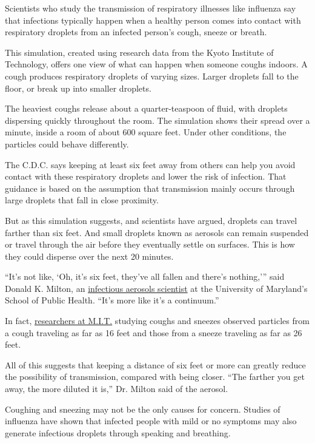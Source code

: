 Scientists who study the transmission of respiratory illnesses like
influenza say that infections typically happen when a healthy person
comes into contact with respiratory droplets from an infected person's
cough, sneeze or breath.

This simulation, created using research data from the Kyoto Institute of
Technology, offers one view of what can happen when someone coughs
indoors. A cough produces respiratory droplets of varying sizes. Larger
droplets fall to the floor, or break up into smaller droplets.

The heaviest coughs release about a quarter-teaspoon of fluid, with
droplets dispersing quickly throughout the room. The simulation shows
their spread over a minute, inside a room of about 600 square feet.
Under other conditions, the particles could behave differently.

The C.D.C. says keeping at least six feet away from others can help you
avoid contact with these respiratory droplets and lower the risk of
infection. That guidance is based on the assumption that transmission
mainly occurs through large droplets that fall in close proximity.

But as this simulation suggests, and scientists have argued, droplets
can travel farther than six feet. And small droplets known as aerosols
can remain suspended or travel through the air before they eventually
settle on surfaces. This is how they could disperse over the next 20
minutes.

``It's not like, `Oh, it's six feet, they've all fallen and there's
nothing,''' said Donald K. Milton, an
\href{https://www.pnas.org/content/115/5/1081}{infectious
aerosol}\href{https://www.pnas.org/content/115/5/1081}{s scientist} at
the University of Maryland's School of Public Health. ``It's more like
it's a continuum.''

In fact,
\href{https://jamanetwork.com/journals/jama/fullarticle/2763852}{researchers
at M.I.T.} studying coughs and sneezes observed particles from a cough
traveling as far as 16 feet and those from a sneeze traveling as far as
26 feet.

All of this suggests that keeping a distance of six feet or more can
greatly reduce the possibility of transmission, compared with being
closer. ``The farther you get away, the more diluted it is,'' Dr. Milton
said of the aerosol.

Coughing and sneezing may not be the only causes for concern. Studies of
influenza have shown that infected people with mild or no symptoms may
also generate infectious droplets through speaking and breathing.

